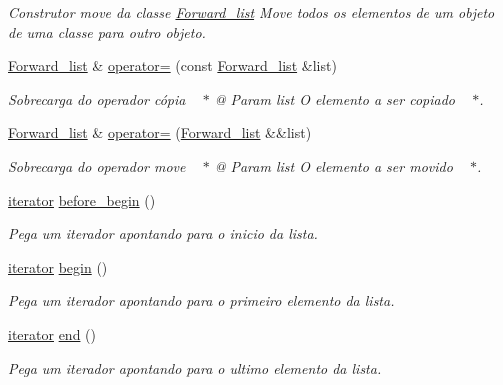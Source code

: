 \begin{DoxyCompactItemize}
\begin{DoxyCompactList}\small\item\em Construtor move da classe \hyperlink{class_forward__list}{Forward\+\_\+list} Move todos os elementos de um objeto de uma classe para outro objeto. \end{DoxyCompactList}\item 
\hyperlink{class_forward__list}{Forward\+\_\+list} \& \hyperlink{class_forward__list_a3220cc90bc1bb27b0e619c337fab15d1}{operator=} (const \hyperlink{class_forward__list}{Forward\+\_\+list} \&list)
\begin{DoxyCompactList}\small\item\em Sobrecarga do operador cópia   $\ast$ @ Param list O elemento a ser copiado   $\ast$. \end{DoxyCompactList}\item 
\hyperlink{class_forward__list}{Forward\+\_\+list} \& \hyperlink{class_forward__list_a00a7638bfa3b628a8593a5860c94aea2}{operator=} (\hyperlink{class_forward__list}{Forward\+\_\+list} \&\&list)
\begin{DoxyCompactList}\small\item\em Sobrecarga do operador move   $\ast$ @ Param list O elemento a ser movido   $\ast$. \end{DoxyCompactList}\item 
\hyperlink{class_forward__list_1_1iterator}{iterator} \hyperlink{class_forward__list_a07be2a83d44326a8cd0b5cdf1f812bd4}{before\+\_\+begin} ()
\begin{DoxyCompactList}\small\item\em Pega um iterador apontando para o inicio da lista. \end{DoxyCompactList}\item 
\hyperlink{class_forward__list_1_1iterator}{iterator} \hyperlink{class_forward__list_a6bb9ba980c3609dddf08078b6d58f817}{begin} ()
\begin{DoxyCompactList}\small\item\em Pega um iterador apontando para o primeiro elemento da lista. \end{DoxyCompactList}\item 
\hyperlink{class_forward__list_1_1iterator}{iterator} \hyperlink{class_forward__list_a468b0e5cf01c8fc2750e0e5f960a76a3}{end} ()
\begin{DoxyCompactList}\small\item\em Pega um iterador apontando para o ultimo elemento da lista. \end{DoxyCompactList}\item 

\end{DoxyCompactItemize}
